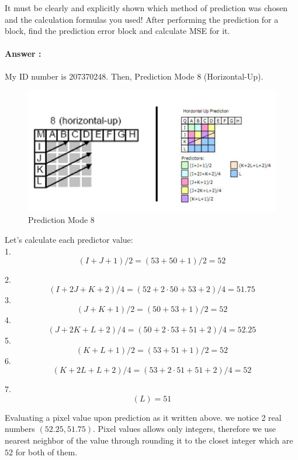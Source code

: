 \documentclass[letterpaper, 12pt]{article}
\begin{document}
It must be clearly and explicitly shown which method of prediction was chosen and the calculation formulas you used!
After performing the prediction for a block, find the prediction error block and calculate MSE for it.

\newpage
\paragraph{Answer :} My ID number is 207370248. Then, Prediction Mode 8 (Horizontal-Up).
\begin{figure}[htbp]
    \centering
            \caption{Prediction Mode 8}

    \includegraphics[width=0.75\linewidth]{FINAL_ASSIGNMENT/Prediction Mode.png}
    
\end{figure}

Let's calculate each predictor value: \\
1.
\[(I+J+1)/2 = (53+50+1)/2 = 52\]

2.
\[(I+2J+K+2)/4 = (52+2\cdot 50 + 53 + 2)/4 = 51.75\]
3.
\[(J+K+1)/2 = (50 + 53 + 1)/2 = 52\]
4.
\[(J+2K+L+2)/4 = (50 + 2 \cdot 53 + 51 + 2)/4 = 52.25\]
5. 
\[(K+L+1)/2 = (53 + 51 + 1)/2 = 52\]
6. 
\[(K+2L+L+2)/4 = (53 + 2 \cdot 51 + 51 + 2)/4 = 52\]

7.
\[(L) = 51\]

Evaluating a pixel value upon prediction as it written above. we notice 2 real numbers $(52.25,51.75)$. Pixel values allows only integers, therefore we use nearest neighbor of the value through rounding it to the closet integer which are $52$ for both of them.
\end{document}
